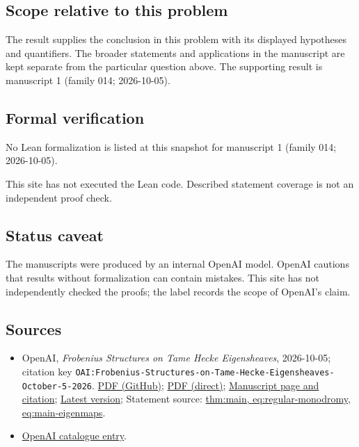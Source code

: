 \documentclass[11pt]{article}
\begin{document}
\subsection{Scope relative to this problem}
The result supplies the conclusion in this problem with its displayed hypotheses and quantifiers. The broader statements and applications in the manuscript are kept separate from the particular question above. The supporting result is manuscript 1 (family 014; 2026-10-05).

\subsection{Formal verification}
No Lean formalization is listed at this snapshot for manuscript 1 (family 014; 2026-10-05).

This site has not executed the Lean code. Described statement coverage is not an independent proof check.

\subsection{Status caveat}
The manuscripts were produced by an internal OpenAI model. OpenAI cautions that results without formalization can contain mistakes. This site has not independently checked the proofs; the label records the scope of OpenAI's claim.

\subsection{Sources}
\begin{itemize}
\item OpenAI, \emph{Frobenius Structures on Tame Hecke Eigensheaves}, 2026-10-05; citation key \texttt{OAI:Frobenius-Structures-on-Tame-Hecke-Eigensheaves-October-5-2026}. \href{https://github.com/openai/math/blob/adc7f1241b42e322a6451854ab7e4b4c146bf78a/preprints/Frobenius-Structures-on-Tame-Hecke-Eigensheaves-October-5-2026/tame-hecke-frobenius.pdf}{PDF (GitHub)}; \href{https://github.com/openai/math/raw/adc7f1241b42e322a6451854ab7e4b4c146bf78a/preprints/Frobenius-Structures-on-Tame-Hecke-Eigensheaves-October-5-2026/tame-hecke-frobenius.pdf}{PDF (direct)}; \href{https://github.com/openai/math/blob/adc7f1241b42e322a6451854ab7e4b4c146bf78a/preprints/Frobenius-Structures-on-Tame-Hecke-Eigensheaves-October-5-2026/README.md}{Manuscript page and citation}; \href{https://github.com/openai/math/blob/main/preprints/Frobenius-Structures-on-Tame-Hecke-Eigensheaves-October-5-2026/tame-hecke-frobenius.pdf}{Latest version}; Statement source: \href{https://github.com/openai/math/blob/adc7f1241b42e322a6451854ab7e4b4c146bf78a/preprints/Frobenius-Structures-on-Tame-Hecke-Eigensheaves-October-5-2026/build/sections/introduction.tex\#L36}{thm:main, eq:regular-monodromy, eq:main-eigenmaps}.
\item \href{https://github.com/openai/math/blob/adc7f1241b42e322a6451854ab7e4b4c146bf78a/CONTENTS.md}{OpenAI catalogue entry}.
\end{itemize}
\end{document}
